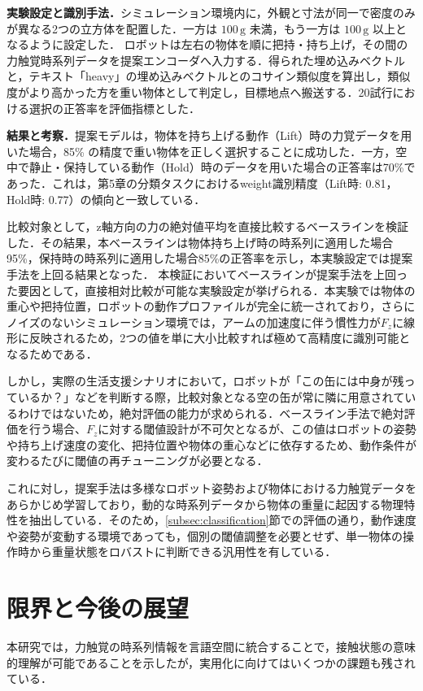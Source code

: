 \documentclass[Japanese]{dicomopapers}
\begin{document}
\textbf{実験設定と識別手法．}シミュレーション環境内に，外観と寸法が同一で密度のみが異なる2つの立方体を配置した．一方は $100\,\text{g}$ 未満，もう一方は $100\,\text{g}$ 以上となるように設定した．
ロボットは左右の物体を順に把持・持ち上げ，その間の力触覚時系列データを提案エンコーダへ入力する．得られた埋め込みベクトルと，テキスト「heavy」の埋め込みベクトルとのコサイン類似度を算出し，類似度がより高かった方を重い物体として判定し，目標地点へ搬送する．20試行における選択の正答率を評価指標とした．

\textbf{結果と考察．}提案モデルは，物体を持ち上げる動作（Lift）時の力覚データを用いた場合，85\% の精度で重い物体を正しく選択することに成功した．一方，空中で静止・保持している動作（Hold）時のデータを用いた場合の正答率は70\%であった．これは，第5章の分類タスクにおけるweight識別精度（Lift時: 0.81，Hold時: 0.77）の傾向と一致している．%

比較対象として，z軸方向の力の絶対値平均を直接比較するベースラインを検証した．その結果，本ベースラインは物体持ち上げ時の時系列に適用した場合95\%，保持時の時系列に適用した場合85\%の正答率を示し，本実験設定では提案手法を上回る結果となった．
本検証においてベースラインが提案手法を上回った要因として，直接相対比較が可能な実験設定が挙げられる．本実験では物体の重心や把持位置，ロボットの動作プロファイルが完全に統一されており，さらにノイズのないシミュレーション環境では，アームの加速度に伴う慣性力が$F_z$に線形に反映されるため，2つの値を単に大小比較すれば極めて高精度に識別可能となるためである．

しかし，実際の生活支援シナリオにおいて，ロボットが「この缶には中身が残っているか？」などを判断する際，比較対象となる空の缶が常に隣に用意されているわけではないため，絶対評価の能力が求められる．ベースライン手法で絶対評価を行う場合、$F_z$に対する閾値設計が不可欠となるが、この値はロボットの姿勢や持ち上げ速度の変化、把持位置や物体の重心などに依存するため、動作条件が変わるたびに閾値の再チューニングが必要となる．

これに対し，提案手法は多様なロボット姿勢および物体における力触覚データをあらかじめ学習しており，動的な時系列データから物体の重量に起因する物理特性を抽出している．そのため，\ref{subsec:classification}節での評価の通り，動作速度や姿勢が変動する環境であっても，個別の閾値調整を必要とせず、単一物体の操作時から重量状態をロバストに判断できる汎用性を有している．

\section{限界と今後の展望}
本研究では，力触覚の時系列情報を言語空間に統合することで，接触状態の意味的理解が可能であることを示したが，実用化に向けてはいくつかの課題も残されている．
\end{document}
